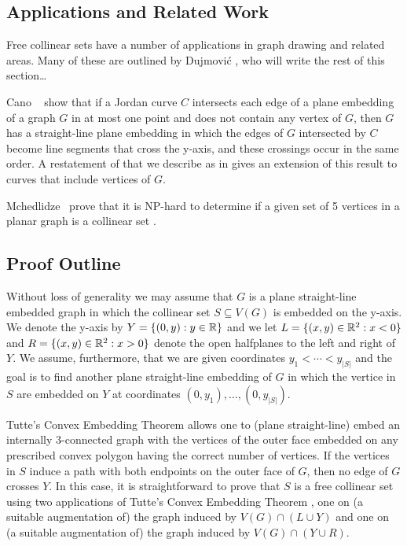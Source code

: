 \documentclass{patmorin}
\begin{document}
\subsection{Applications and Related Work}

Free collinear sets have a number of applications in graph drawing
and related areas.  Many of these are outlined by Dujmovi\'c
\cite{dujmovic:utility}, who will write the rest of this section\ldots

Cano \etal\ \cite[Theorem~2]{cano.toth.ea:upper} show that if a Jordan
curve $C$ intersects each edge of a plane embedding of a graph $G$ in
at most one point and does not contain any vertex of $G$, then $G$ has
a straight-line plane embedding in which the edges of $G$ intersected
by $C$ become line segments that cross the y-axis, and these crossings
occur in the same order.  A restatement of  that
we describe as  in  gives an
extension of this result to curves that include vertices of $G$.

Mchedlidze \etal\ prove that it is NP-hard to determine if a
given set of 5 vertices in a planar graph is a collinear set
\cite{mchedlidze.radermacher.ea:aligned}.

\subsection{Proof Outline}

Without loss of generality we may assume that $G$ is a plane straight-line
embedded graph in which the collinear set $S\subseteq V(G)$ is embedded
on the y-axis. We denote the y-axis by $Y=\{(0,y):y\in\mathbb{R}\}$ and we let
$L=\{(x,y)\in\mathbb{R}^2:x<0\}$ and $R=\{(x,y)\in\mathbb{R}^2: x >0\}$ denote the open
halfplanes to the left and right of $Y$.  We assume, furthermore, that
we are given coordinates $y_1<\cdots<y_{|S|}$ and the goal is to find
another plane straight-line embedding of $G$ in which the vertice in $S$
are embedded on $Y$ at coordinates $(0,y_1),\ldots,(0,y_{|S|})$.

Tutte's Convex Embedding Theorem \cite{tutte:how} allows one to (plane
straight-line) embed an internally 3-connected graph with the vertices
of the outer face embedded on any prescribed convex polygon having the
correct number of vertices.  If the vertices in $S$ induce a path with
both endpoints on the outer face of $G$, then no edge of $G$ crosses
$Y$. In this case, it is straightforward to prove that $S$ is a free
collinear set using two applications of Tutte's Convex Embedding Theorem
\cite{tutte:how}, one on (a suitable augmentation of) the graph induced
by $V(G)\cap(L\cup Y)$ and one on (a suitable augmentation of) the graph
induced by $V(G)\cap(Y\cup R)$.
\end{document}
